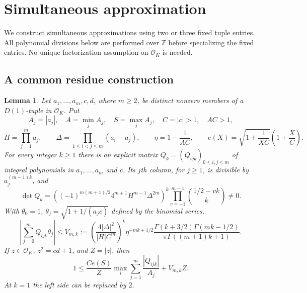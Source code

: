 \documentclass[12pt]{article}
\newtheorem{lemma}[theorem]{Lemma}
\numberwithin{equation}{section}
\begin{document}
\section{Simultaneous approximation}

We construct simultaneous approximations using two or three fixed tuple entries.  All polynomial divisions below are performed over $\mathbb Z$ before specializing the fixed entries. No unique factorization assumption on $\mathcal O_K$ is needed.

\subsection{A common residue construction}

\begin{lemma}\label{lem:ordinary-residue-construction}
Let $a_1,\ldots,a_m,c,d$, where $m\ge2$, be distinct nonzero members of
a $D(1)$-tuple in $\mathcal O_K$.  Put
\[
 A_j=|a_j|,\quad A=\min_j A_j,\quad S=\max_j A_j,
 \quad C=|c|>1,\quad AC>1,
\]
\[
 H=\prod_{j=1}^m a_j,\qquad
 \Delta=\prod_{1\le i<j\le m}(a_i-a_j),\qquad
 \eta=1-\frac1{AC},\qquad
 e(X)=\sqrt{1+\frac1{XC}}\left(1+\frac XC\right).
\]
For every integer $k\ge1$ there is an explicit matrix
$Q_k=(Q_{ijk})_{0\le i,j\le m}$ of integral polynomials in $a_1,\ldots,a_m$ and $c$.  Its $j$th column, for $j\ge1$, is divisible by
$a_j^{(m-1)k}$, and
\begin{equation}\label{eq:ordinary-residue-det}
 \det Q_k=
 \left((-1)^{m(m+1)/2}4^{m+1}H^{m-1}\Delta^{2m}\right)^k
 \prod_{v=-1}^{m-1}\binom{1/2-vk}{k}\ne0.
\end{equation}
With $\theta_0=1$, $\theta_j=\sqrt{1+1/(a_jc)}$ defined by the binomial series,
\begin{equation}\label{eq:ordinary-residue-error}
 \left|\sum_{j=0}^mQ_{ijk}\theta_j\right|
 \le V_{m,k}:=
 \left(\frac{4|\Delta|^2}{|H|C^m}\right)^k
 \eta^{-mk+1/2}
 \frac{\Gamma(k+3/2)\Gamma(mk-1/2)}
 {\pi\Gamma((m+1)k+1)}.
\end{equation}
If $z\in\mathcal O_K$, $z^2=cd+1$, and $Z=|z|$, then
\begin{equation}\label{eq:ordinary-root-transfer}
 1\le\frac{Ce(S)}Z
       \max_i\sum_{j=1}^m\frac{|Q_{ijk}|}{A_j}
       +V_{m,k}Z.
\end{equation}
At $k=1$ the left side can be replaced by $2$.
\end{lemma}
\end{document}
